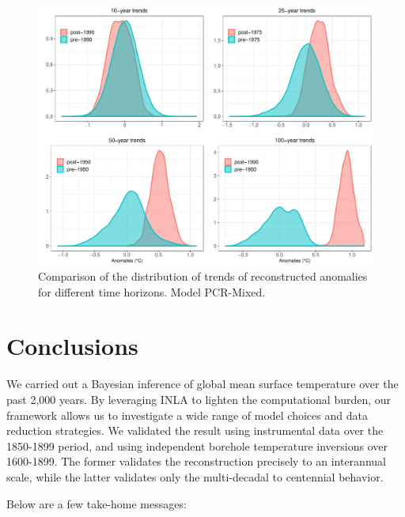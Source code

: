 \documentclass[12pt]{amsart}
\theoremstyle{plain}
\theoremstyle{definition}
\theoremstyle{remark}
\begin{document}
\begin{figure}
  \centering
  \includegraphics[scale=0.35]{compTrends}
  \caption{Comparison of the distribution of trends of reconstructed anomalies for different time horizons. Model PCR-Mixed.}
  \label{fig:comptrends}
\end{figure}

\section{Conclusions}
We carried out a Bayesian inference of global mean surface temperature over
the past 2,000 years. By leveraging INLA to lighten the computational burden, our framework allows us to investigate a wide range of model choices and data reduction strategies.  We validated the result using instrumental data over the 1850-1899 period, and using independent borehole temperature inversions over 1600-1899. The former validates the reconstruction precisely to an interannual scale, while the latter validates only the multi-decadal to centennial behavior.  

Below are a few take-home messages:
\end{document}
